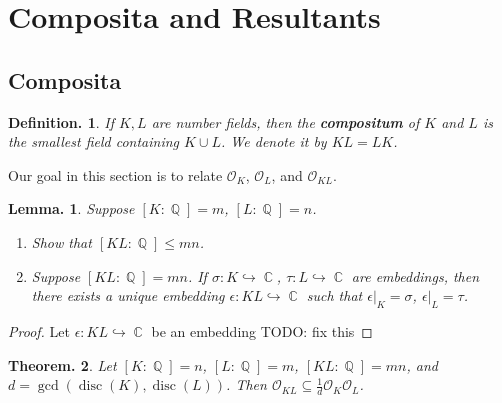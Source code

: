 \documentclass[11pt, a4paper]{memoir}
\DeclareMathOperator{\Q}{{\mathbb{Q}}}
\DeclareMathOperator{\C}{{\mathbb{C}}}
\newcommand{\hto}[0]{\ensuremath{\hookrightarrow}}
\theoremstyle{change}
\newtheorem{theorem}{Theorem.}[section]
\newtheorem{lemma}[theorem]{Lemma.}
\theoremstyle{plain}
\theoremstyle{nonumberplain}
\newtheorem{definition}{Definition.}
\newtheorem{remark}{Remark.}
\newtheorem{proof}{Proof}
\DeclareMathOperator{\disc}{disc}
\newcommand{\quot}[2]{\mathchoice{\left.\raisebox{0.13em}{$#1$}\middle/\raisebox{-0.13em}{$#2$}\right.}
                                 {\left.\raisebox{0.07em}{$#1$}\middle/\raisebox{-0.07em}{$#2$}\right.}
                                 {\left.\raisebox{0.03em}{$#1$}\middle/\raisebox{-0.03em}{$#2$}\right.}
                                 {\left.\raisebox{0em}{$#1$}\middle/\raisebox{0em}{$#2$}\right.}}
\newcommand{\mbf}[1]{{\boldmath\bfseries #1}}
\numberwithin{equation}{section}
\begin{document}
\section{Composita and Resultants}
\subsection{Composita}
\begin{definition}
    If $K,L$ are number fields, then the \mbf{compositum} of $K$ and $L$ is the smallest field containing $K\cup L$.
    We denote it by $KL=LK$.
\end{definition}
Our goal in this section is to relate $\mathcal{O}_K$, $\mathcal{O}_L$, and $\mathcal{O}_{KL}$.
\begin{lemma}\label{lem:ext-comp}
    Suppose $[K:\Q]=m$, $[L:\Q]=n$.
    \begin{enumerate}[nl,r]
        \item Show that $[KL:\Q]\leq mn$.
        \item Suppose $[KL:\Q]=mn$.
            If $\sigma:K\hto\C$, $\tau:L\hto\C$ are embeddings, then there exists a unique embedding $\epsilon:KL\hto\C$ such that $\epsilon|_K=\sigma$, $\epsilon|_L=\tau$.
    \end{enumerate}
\end{lemma}
\begin{proof}
    Let $\epsilon:KL\hto\C$ be an embedding
    TODO: fix this
\end{proof}
\begin{theorem}\label{thm:comp}
    Let $[K:\Q]=n$, $[L:\Q]=m$, $[KL:\Q]=mn$, and $d=\gcd(\disc(K),\disc(L))$.
    Then $\mathcal{O}_{KL}\subseteq\frac{1}{d}\mathcal{O}_K\mathcal{O}_L$.
\end{theorem}
\end{document}
